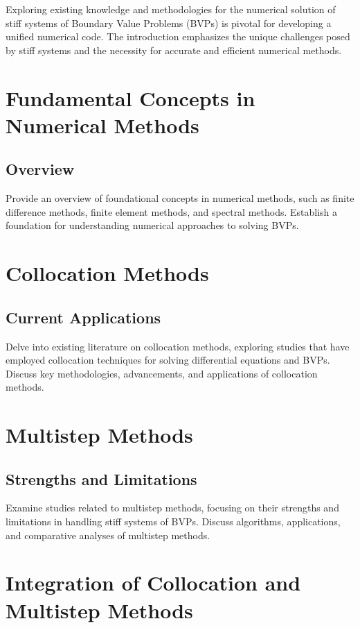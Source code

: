 \documentclass{report}
\begin{document}
Exploring existing knowledge and methodologies for the numerical solution of stiff systems of Boundary Value Problems (BVPs) is pivotal for developing a unified numerical code. The introduction emphasizes the unique challenges posed by stiff systems and the necessity for accurate and efficient numerical methods.

\section{Fundamental Concepts in Numerical Methods}

\subsection{Overview}

Provide an overview of foundational concepts in numerical methods, such as finite difference methods, finite element methods, and spectral methods. Establish a foundation for understanding numerical approaches to solving BVPs.

\section{Collocation Methods}

\subsection{Current Applications}

Delve into existing literature on collocation methods, exploring studies that have employed collocation techniques for solving differential equations and BVPs. Discuss key methodologies, advancements, and applications of collocation methods.

\section{Multistep Methods}

\subsection{Strengths and Limitations}

Examine studies related to multistep methods, focusing on their strengths and limitations in handling stiff systems of BVPs. Discuss algorithms, applications, and comparative analyses of multistep methods.

\section{Integration of Collocation and Multistep Methods}
\end{document}
